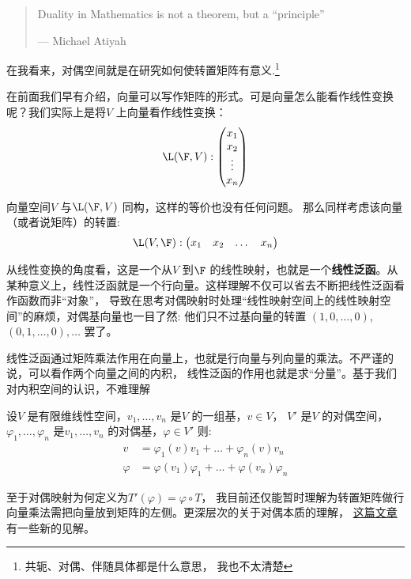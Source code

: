 \begin{quote}
    Duality in Mathematics is not a theorem, but a ``principle''

    \hfill --- Michael Atiyah
\end{quote}

在我看来，对偶空间就是在研究如何使转置矩阵有意义.\footnote{共轭、对偶、伴随具体都是什么意思，
我也不太清楚}

在前面我们早有介绍，向量可以写作矩阵的形式。可是向量怎么能看作线性变换呢？我们实际上是将\(V\)
上向量看作线性变换：\[
    \L(\F,V):
    \begin{pmatrix}
        x_1 \\
        x_2 \\
        \vdots \\
        x_n
    \end{pmatrix}
\]

向量空间\(V\) 与\(\L(\F,V)\) 同构，这样的等价也没有任何问题。
那么同样考虑该向量（或者说矩阵）的转置:
\[
    \L(V,\F):
    \begin{pmatrix}
        x_1 & x_2 & \dots & x_n
    \end{pmatrix}
\]

从线性变换的角度看，这是一个从\(V\) 到\(\F\) 的线性映射，也就是一个\textbf{线性泛函}。从某种意义上，线性泛函就是一个行向量。这样理解不仅可以省去不断把线性泛函看作函数而非``对象''，
导致在思考对偶映射时处理``线性映射空间上的线性映射空间''的麻烦，对偶基向量也一目了然:
他们只不过基向量的转置 \((1,0,\dots ,0)\),\((0,1,\dots ,0),\dots \) 罢了。

线性泛函通过矩阵乘法作用在向量上，也就是行向量与列向量的乘法。不严谨的说，可以看作两个向量之间的内积，
线性泛函的作用也就是求``分量''。基于我们对内积空间的认识，不难理解
\begin{theorem}
    设\(V\) 是有限维线性空间，\(v_{1}, \dots ,v_{n}\) 是\(V\) 的一组基，\(v \in V\)，
    \(V'\) 是\(V\) 的对偶空间，\(\varphi_{1}, \dots ,\varphi_{n}\)
    是\(v_{1}, \dots ,v_{n}\) 的对偶基，\(\varphi \in V'\)
    则:
    \begin{align*}
        v &= \varphi_{1}(v)v_{1} + \dots + \varphi_{n}(v)v_{n} \\
        \varphi &= \varphi(v_{1})\varphi_{1} + \dots +
        \varphi(v_{n})\varphi_{n}
    \end{align*}
\end{theorem}

至于对偶映射为何定义为\(T'(\varphi)=\varphi \circ T\)，
我目前还仅能暂时理解为转置矩阵做行向量乘法需把向量放到矩阵的左侧。更深层次的关于对偶本质的理解，
\href{https://www.zhihu.com/question/38464481/answer/2110009942}{这篇文章}有一些新的见解。
